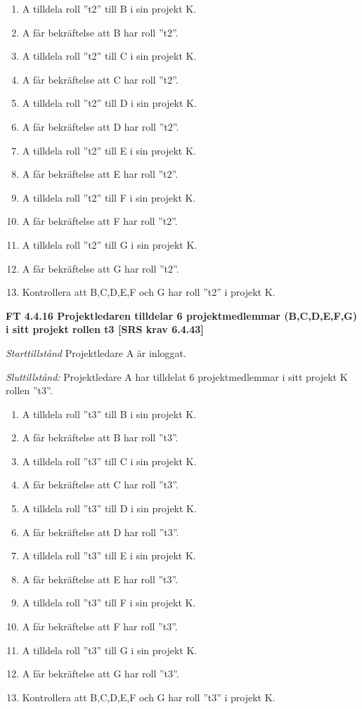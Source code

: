 \documentclass[a4paper]{article}
\begin{document}
\begin{enumerate}
\item A tilldela roll ”t2” till B i sin projekt K. 
\item A får bekräftelse att B har roll ”t2”.
\item A tilldela roll ”t2” till C i sin projekt K. 
\item A får bekräftelse att C har roll ”t2”.
\item A tilldela roll ”t2” till D i sin projekt K. 
\item A får bekräftelse att D har roll ”t2”.
\item A tilldela roll ”t2” till E i sin projekt K. 
\item A får bekräftelse att  E har roll ”t2”.
\item A tilldela roll ”t2” till  F i sin projekt K. 
\item A får bekräftelse att  F har roll ”t2”.
\item A tilldela roll ”t2” till G i sin projekt K. 
\item A får bekräftelse att G har roll ”t2”.
\item Kontrollera att B,C,D,E,F och G har roll ”t2” i projekt K.
\end{enumerate}

\textbf{FT 4.4.16 Projektledaren tilldelar 6 projektmedlemmar (B,C,D,E,F,G) i sitt projekt rollen t3 [SRS krav 6.4.43]}

\emph{Starttillstånd} Projektledare A är inloggat.

\emph{Sluttillstånd:} Projektledare A  har tilldelat 6 projektmedlemmar i sitt projekt K rollen ''t3''.

\begin{enumerate}
\item A tilldela roll ”t3” till B i sin projekt K. 
\item A får bekräftelse att B har roll ”t3”.
\item A tilldela roll ”t3” till C i sin projekt K. 
\item A får bekräftelse att C har roll ”t3”.
\item A tilldela roll ”t3” till D i sin projekt K. 
\item A får bekräftelse att D har roll ”t3”.
\item A tilldela roll ”t3” till E i sin projekt K. 
\item A får bekräftelse att E har roll ”t3”.
\item A tilldela roll ”t3” till F i sin projekt K. 
\item A får bekräftelse att F har roll ”t3”.
\item A tilldela roll ”t3” till G i sin projekt K. 
\item A får bekräftelse att G har roll ”t3”.
\item Kontrollera att B,C,D,E,F och G har roll ”t3” i projekt K.
\end{enumerate}
\end{document}
